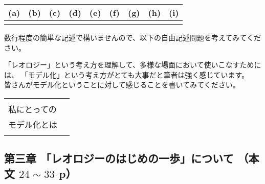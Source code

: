 \documentclass[uplatex,dvipdfmx,a4paper,11pt]{jsarticle}
\begin{document}
\begin{qlist}
  \begin{table}[htb]
    \begin{center} 
      \begin{tabular}{|p{}|p{}|p{}|p{}|p{}|p{}|p{}|p{}|p{}|} \hline
        (a) & (b) & (c) & (d) & (e) & (f) & (g) & (h) & (i)\\ \hline
          &  & & & & & & &  \\ \hline		
      \end{tabular}
    \end{center}
  \end{table}

\end{qlist}

\clearpage
{}
数行程度の簡単な記述で構いませんので、以下の自由記述問題を考えてみてください。
\begin{qlist}
\qitem 「レオロジー」という考え方を理解して、多様な場面において使いこなすためには、
「モデル化」という考え方がとても大事だと筆者は強く感じています。\\
皆さんがモデル化ということに対して感じることを書いてみてください。
\end{qlist}
\begin{table}[htb]
  \begin{center} 
    \begin{tabular}{|l|p{}|} \hline
      & \\
      私にとっての  & \\
      モデル化とは  & \\ 
      & \\ \hline
    \end{tabular}
  \end{center}
\end{table}

\clearpage
\subsection*{第三章 「レオロジーのはじめの一歩」について （本文 $24\sim33$ p）}
\end{document}
